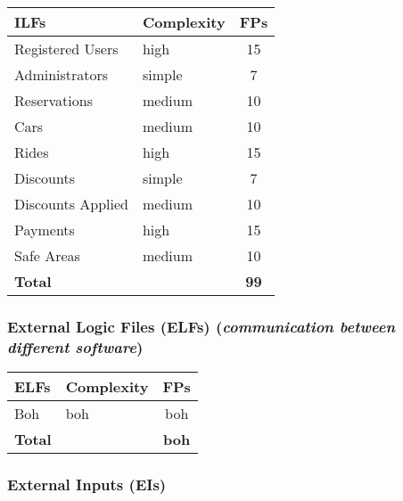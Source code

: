 \begin{center}
	\begin{tabular}{|l|l|c|}
		\hline
		\textbf{ILFs} 	& \textbf{Complexity} 	& \textbf{FPs} \\
		\hline
		Registered Users 	& high 	& 15 \\
		Administrators 	& simple 	& 7 \\
		Reservations 	& medium 	& 10 \\
		Cars 	& medium	& 10 \\
		Rides 	& high 	& 15 \\
		Discounts 	& simple 	& 7 \\
		Discounts Applied 	& medium 	& 10 \\
		Payments 	& high	& 15 \\
		Safe Areas  	& medium	& 10 \\
		\hline \hline
		\textbf{Total} 	& 	& \textbf{99} \\
		\hline
	\end{tabular}
\end{center}

\subsubsection{External Logic Files (ELFs) (\textit{communication between different software})}

	
\begin{center}
	\begin{tabular}{|l|l|c|}
		\hline
		\textbf{ELFs} 	& \textbf{Complexity} 	& \textbf{FPs} \\
		\hline
		Boh 	& boh 	& boh \\

		\hline \hline
		\textbf{Total} 	& 	& \textbf{boh} \\
		\hline
	\end{tabular}
\end{center}


\subsubsection{External Inputs (EIs)}

